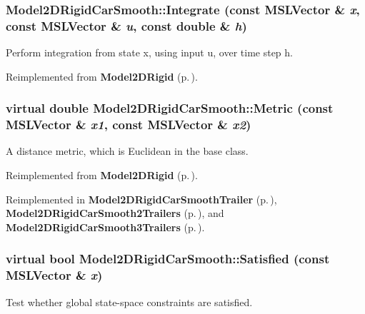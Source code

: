 \subsubsection{ Model2DRigid\-Car\-Smooth::Integrate (const {\bf MSLVector} \& {\em x}, const {\bf MSLVector} \& {\em u}, const double \& {\em h})\hspace{0.3cm}{\tt  [virtual]}}\label{class_Model2DRigidCarSmooth_a3}


Perform integration from state x, using input u, over time step h.



Reimplemented from {\bf Model2DRigid} {\rm (p.\,\pageref{class_Model2DRigid_a2})}.
\subsubsection{\setlength{\rightskip}{0pt plus 5cm}virtual double Model2DRigid\-Car\-Smooth::Metric (const {\bf MSLVector} \& {\em x1}, const {\bf MSLVector} \& {\em x2})\hspace{0.3cm}{\tt  [virtual]}}\label{class_Model2DRigidCarSmooth_a4}


A distance metric, which is Euclidean in the base class.



Reimplemented from {\bf Model2DRigid} {\rm (p.\,\pageref{class_Model2DRigid_a5})}.

Reimplemented in {\bf Model2DRigid\-Car\-Smooth\-Trailer} {\rm (p.\,\pageref{class_Model2DRigidCarSmoothTrailer_a3})}, {\bf Model2DRigid\-Car\-Smooth2Trailers} {\rm (p.\,\pageref{class_Model2DRigidCarSmooth2Trailers_a3})}, and {\bf Model2DRigid\-Car\-Smooth3Trailers} {\rm (p.\,\pageref{class_Model2DRigidCarSmooth3Trailers_a3})}.
\subsubsection{\setlength{\rightskip}{0pt plus 5cm}virtual bool Model2DRigid\-Car\-Smooth::Satisfied (const {\bf MSLVector} \& {\em x})\hspace{0.3cm}{\tt  [virtual]}}\label{class_Model2DRigidCarSmooth_a6}


Test whether global state-space constraints are satisfied.




